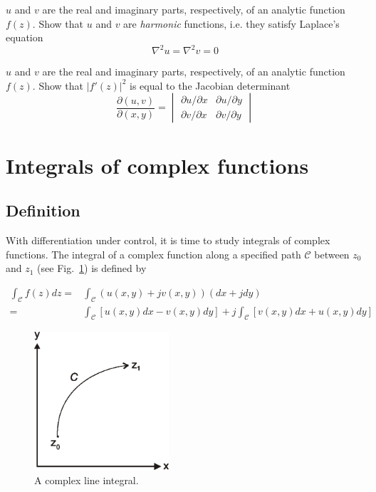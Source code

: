\begin{sidebar}
\begin{ex} \label{ex-harmonic}
$u$ and $v$ are the real and imaginary parts, respectively, of an analytic function $f(z)$. Show that $u$ and $v$ are \emph{harmonic} functions, i.e. they satisfy Laplace's equation
$$\nabla^2 u = \nabla^2 v = 0$$
\end{ex}
\end{sidebar}

\begin{sidebar}
\begin{ex} \label{ex-harmonic}
$u$ and $v$ are the real and imaginary parts, respectively, of an analytic function $f(z)$. Show that $|f'(z)|^2$ is equal to the Jacobian determinant
$$\frac{\partial (u,v)}{\partial (x,y)} =  \begin{vmatrix} \partial u / \partial x & \partial u / \partial y \\ \partial v / \partial x & \partial v / \partial y \end{vmatrix}$$
\end{ex}
\end{sidebar}



\section{Integrals of complex functions}

\subsection{Definition}
With differentiation under control, it is time to study integrals of complex
functions. The integral of a complex function along a specified path
$\mathcal{C}$ between $z_0$ and $z_1$ (see Fig.~\ref{fig-integral}) is defined
by

\begin{align}
\int_\mathcal{C}f(z)dz = & \int_\mathcal{C}\left(u(x,y)+jv(x,y)\right)(dx+jdy)
\nonumber \\
= & \int_\mathcal{C}\left[u(x,y)dx-v(x,y)dy\right] + j
\int_\mathcal{C}\left[v(x,y)dx+u(x,y)dy\right] \label{eq-complex-int}
\end{align} 

\begin{figure}
\centering
\includegraphics[width=5cm]{complex/figures/integral}
\caption{A complex line integral.}
\label{fig-integral}
\end{figure}

